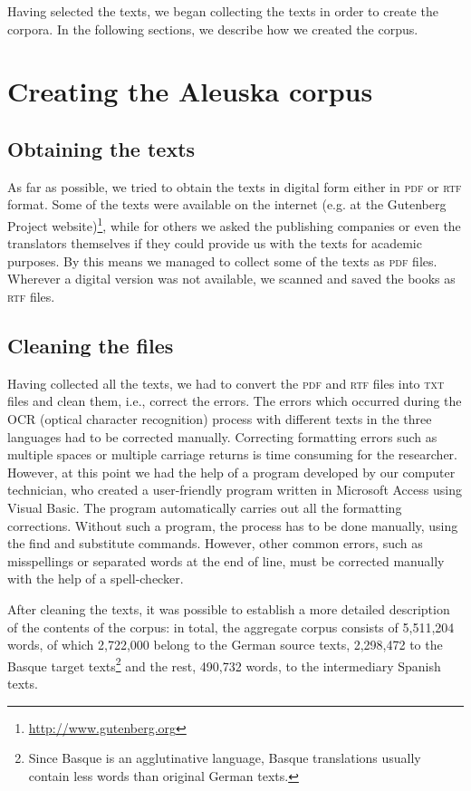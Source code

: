 \documentclass[output=paper]{LSP/langsci}
\begin{document}
Having selected the texts, we began collecting the texts in order to create the corpora. In the following sections, we describe how we created the corpus.

\section{Creating the Aleuska corpus}
\subsection{Obtaining the texts}

As far as possible, we tried to obtain the texts in digital form either in \textsc{pdf} or \textsc{rtf} format. Some of the texts were available on the internet (e.g. at the Gutenberg Project website)\footnote{\url{http://www.gutenberg.org}}, while for others we asked the publishing companies or even the translators themselves if they could provide us with the texts for academic purposes. By this means we managed to collect some of the texts as \textsc{pdf} files. Wherever a digital version was not available, we scanned and saved the books as \textsc{rtf} files.

\subsection{Cleaning the files}

Having collected all the texts, we had to convert the \textsc{pdf} and \textsc{rtf} files into \textsc{txt} files and clean them, i.e., correct the errors. The errors which occurred during the OCR (optical character recognition) process with different texts in the three languages had to be corrected manually. Correcting formatting errors such as multiple spaces or multiple carriage returns is time consuming for the researcher. However, at this point we had the help of a program developed by our computer technician, who created a user-friendly program written in Microsoft Access using Visual Basic. The program automatically carries out all the formatting corrections. Without such a program, the process has to be done manually, using the find and substitute commands. However, other common errors, such as misspellings or separated words at the end of line, must be corrected manually with the help of a spell-checker.

After cleaning the texts, it was possible to establish a more detailed description of the contents of the corpus: in total, the aggregate corpus consists of 5,511,204 words, of which 2,722,000 belong to the German source texts, 2,298,472 to the Basque target texts\footnote{Since Basque is an agglutinative language, Basque translations usually contain less words than original German texts.}  and the rest, 490,732 words, to the intermediary Spanish texts.
\end{document}
